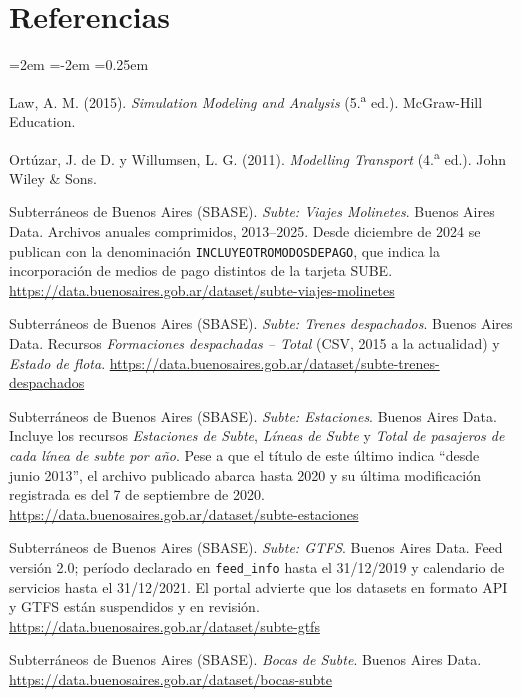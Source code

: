\documentclass{article}
\begin{document}
\section*{Referencias}
\begin{list}{}{\leftmargin=2em \itemindent=-2em \itemsep=0.25em}

\item[] [1] Law, A. M. (2015). \textit{Simulation Modeling and Analysis} (5.\textsuperscript{a} ed.).
McGraw-Hill Education.

\item[] [2] Ortúzar, J. de D. y Willumsen, L. G. (2011). \textit{Modelling Transport} (4.\textsuperscript{a}
ed.). John Wiley \& Sons.

\item[] [3] Subterráneos de Buenos Aires (SBASE). \textit{Subte: Viajes Molinetes}. Buenos Aires Data.
Archivos anuales comprimidos, 2013--2025. Desde diciembre de 2024 se publican con la denominación
\texttt{INCLUYEOTROMODOSDEPAGO}, que indica la incorporación de medios de pago distintos de la tarjeta SUBE.
\url{https://data.buenosaires.gob.ar/dataset/subte-viajes-molinetes}

\item[] [4] Subterráneos de Buenos Aires (SBASE). \textit{Subte: Trenes despachados}. Buenos Aires Data.
Recursos \textit{Formaciones despachadas -- Total} (CSV, 2015 a la actualidad) y \textit{Estado de flota}.
\url{https://data.buenosaires.gob.ar/dataset/subte-trenes-despachados}

\item[] [5] Subterráneos de Buenos Aires (SBASE). \textit{Subte: Estaciones}. Buenos Aires Data. Incluye los
recursos \textit{Estaciones de Subte}, \textit{Líneas de Subte} y \textit{Total de pasajeros de cada línea
de subte por año}. Pese a que el título de este último indica ``desde junio 2013'', el archivo publicado
abarca hasta 2020 y su última modificación registrada es del 7 de septiembre de 2020.
\url{https://data.buenosaires.gob.ar/dataset/subte-estaciones}

\item[] [6] Subterráneos de Buenos Aires (SBASE). \textit{Subte: GTFS}. Buenos Aires Data. Feed versión 2.0;
período declarado en \texttt{feed\_info} hasta el 31/12/2019 y calendario de servicios hasta el 31/12/2021.
El portal advierte que los datasets en formato API y GTFS están suspendidos y en revisión.
\url{https://data.buenosaires.gob.ar/dataset/subte-gtfs}

\item[] [7] Subterráneos de Buenos Aires (SBASE). \textit{Bocas de Subte}. Buenos Aires Data.
\url{https://data.buenosaires.gob.ar/dataset/bocas-subte}


\end{list}
\end{document}
